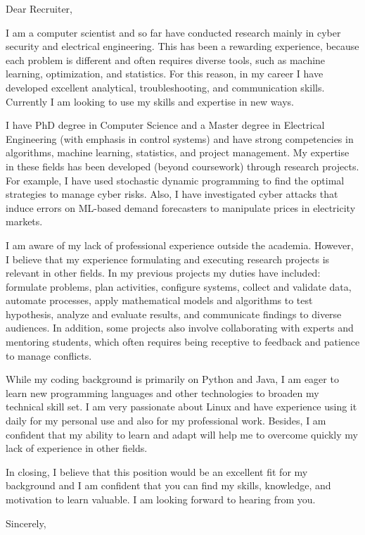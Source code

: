 \documentclass[letter,10pt]{letter}
\newcommand{\position}{ }
\newcommand{\place}{ }
\begin{document}
\begin{letter}{
}
 
\opening{Dear Recruiter,}

I am a computer scientist and so far have conducted research mainly in cyber security and electrical engineering. This has been a rewarding experience, because each problem is different and often requires diverse tools, such as machine learning, optimization, and statistics. For this reason, in my career I have developed excellent analytical, troubleshooting, and communication skills. Currently I am looking to use my skills and expertise in new ways.


I have PhD degree in Computer Science and a Master degree in Electrical Engineering (with emphasis in control systems) and have strong competencies in algorithms, machine learning, statistics, and project management. My expertise in these fields has been developed (beyond coursework) through research projects. 
For example, I have used stochastic dynamic programming to find the optimal strategies to manage cyber risks. Also, I have investigated cyber attacks that induce errors on ML-based demand forecasters to manipulate prices in electricity markets. 


I am aware of my lack of professional experience outside the academia. However, I believe that my experience formulating and executing research projects is relevant in other fields. In my previous projects my duties have included: formulate problems, plan activities, configure systems, collect and validate data, automate processes, apply mathematical models and algorithms to test hypothesis, analyze and evaluate results,  and communicate findings to diverse audiences. In addition, some projects also involve collaborating with experts and mentoring students, which often requires being receptive to feedback and patience to manage conflicts.

While my coding background is primarily on Python and Java, I am eager to learn new programming languages and other technologies to broaden my technical skill set. 
I am very passionate about Linux and have experience using it daily for my personal use and also for my professional work. 
Besides, I am confident that my ability to learn and adapt will help me to overcome quickly my lack of experience in other fields.


In closing, I believe that this position would be an excellent fit for my background and I am confident that you can find my skills, knowledge, and motivation to learn valuable. I am looking forward to hearing from you.


\closing{Sincerely,}



\end{letter}
\end{document}
